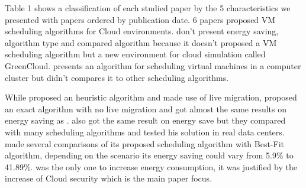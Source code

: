 \documentclass{article}
\begin{document}

Table 1 shows a classification of each studied paper by the 5 characteristics we presented with papers ordered by publication date. 6 papers proposed VM scheduling algorithms for Cloud environments. \cite{Dzmitry} don't present energy saving, algorithm type and compared algorithm because it doesn't proposed a VM scheduling algorithm but a new environment for cloud simulation called GreenCloud. \cite{Gregor} presents an algorithm for scheduling virtual machines in a computer cluster but didn't compares it to other scheduling algorithms.  

While \cite{bli:2009} proposed an heuristic algorithm and made use of live migration, \cite{Andrew} proposed an exact algorithm with no live migration and got almost the same results on energy saving as \cite{bli:2009}. \cite{Beloglazov} also got the same result on energy save but they compared with many scheduling algorithms and tested his solution in real data centers. \cite{Ghribi} made several comparisons of its proposed scheduling algorithm with Best-Fit algorithm, depending on the scenario its energy saving could vary from 5.9\% to 41.89\%. \cite{Farhad} was the only one to increase energy consumption, it was justified by the increase of Cloud security which is the main paper focus. 












\end{document}
